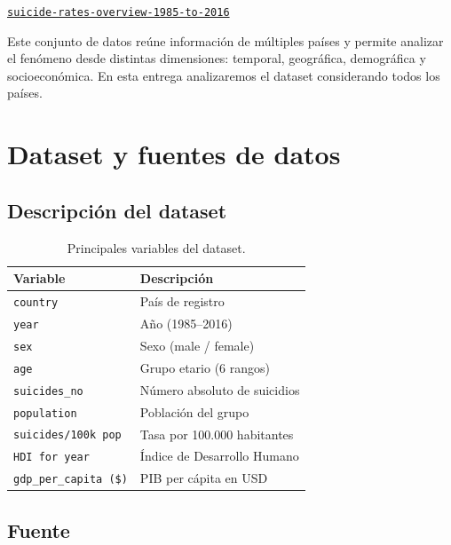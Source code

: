 \documentclass[12pt, letterpaper]{article}
\begin{document}
\begin{center}
  \href{https://www.kaggle.com/datasets/russellyates88/suicide-rates-overview-1985-to-2016}%
  {\texttt{suicide-rates-overview-1985-to-2016}}
\end{center}

Este conjunto de datos reúne información de múltiples países y permite analizar el fenómeno desde
distintas dimensiones: temporal, geográfica, demográfica y socioeconómica. En esta entrega analizaremos el dataset considerando todos los países.

\section{Dataset y fuentes de datos}

\subsection{Descripción del dataset}

\begin{table}[H]
  \centering
  \caption{Principales variables del dataset.}
  \begin{tabular}{lp{9cm}}
    \toprule
    \textbf{Variable} & \textbf{Descripción} \\
    \midrule
    \texttt{country}        & País de registro \\
    \texttt{year}           & Año (1985--2016) \\
    \texttt{sex}            & Sexo (male / female) \\
    \texttt{age}            & Grupo etario (6 rangos) \\
    \texttt{suicides\_no}   & Número absoluto de suicidios \\
    \texttt{population}     & Población del grupo \\
    \texttt{suicides/100k pop} & Tasa por 100.000 habitantes \\
    \texttt{HDI for year}   & Índice de Desarrollo Humano \\
    \texttt{gdp\_per\_capita (\$)} & PIB per cápita en USD \\
    \bottomrule
  \end{tabular}
\end{table}

\subsection{Fuente}
\end{document}
